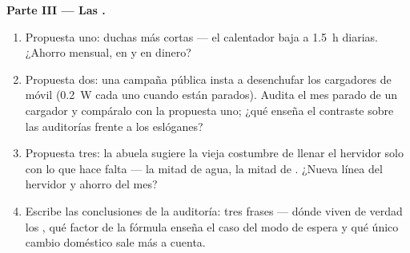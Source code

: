 \begin{problem}
\medskip\noindent\textbf{Parte III --- Las .}
\begin{enumerate}[resume]
  \item Propuesta uno: duchas más cortas --- el calentador baja a
        \qty{1.5}{h} diarias. ¿Ahorro mensual, en
         y en dinero?
  \item Propuesta dos: una campaña pública insta a desenchufar los
        cargadores de móvil (\qty{0.2}{W} cada uno cuando están
        parados). Audita el mes parado de un cargador y compáralo con
        la propuesta uno; ¿qué enseña el contraste sobre las
        auditorías frente a los eslóganes?
  \item Propuesta tres: la abuela sugiere la vieja costumbre de
        llenar el hervidor solo con lo que hace falta --- la mitad de
        agua, la mitad de . ¿Nueva línea del hervidor y
        ahorro del mes?
  \item Escribe las conclusiones de la auditoría: tres frases ---
        dónde viven de verdad los , qué factor de la
        fórmula enseña el caso del modo de espera y qué único cambio
        doméstico sale más a cuenta.
\end{enumerate}
\end{problem}
